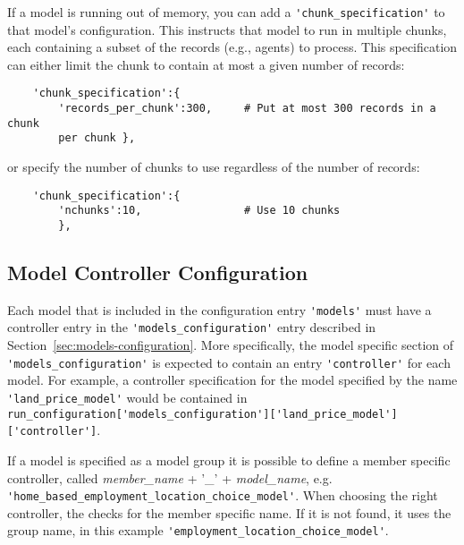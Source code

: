 If a model is running out of memory, you can add a \verb|'chunk_specification'|
to that model's configuration. 
 This instructs that model to run in
multiple chunks, each containing a subset of the records (e.g., agents) to
process. This specification can either limit the chunk to contain at most a
given number of records:

\begin{verbatim}
    'chunk_specification':{
        'records_per_chunk':300,     # Put at most 300 records in a chunk
        per chunk },
\end{verbatim}

or specify the number of chunks to use regardless of the number of records:

\begin{verbatim}
    'chunk_specification':{
        'nchunks':10,                # Use 10 chunks
        },
\end{verbatim}

\subsection{Model Controller Configuration}
\label{sec:model-controller-configuration}
%
Each model that is included in the configuration entry \verb|'models'| \modelsindex must have a
controller entry in the \verb|'models_configuration'| \modelsindex entry described in
Section~\ref{sec:models-configuration}.  More specifically, the model specific
section of \verb|'models_configuration'| \modelsindex is expected to contain an entry \verb|'controller'|
for each model. For example, a controller specification for the model
specified by the name \verb|'land_price_model'| would be contained in\\
\verb|run_configuration['models_configuration']['land_price_model']['controller']|.

If a model is specified as a model group  it is possible to define a member specific controller, called 
{\em member_name} + '_' + {\em model_name}, e.g. \verb|'home_based_employment_location_choice_model'|.
When choosing the right controller, the  checks for the member specific name. If it is not found,
it uses the group name, in this example \verb|'employment_location_choice_model'|.

